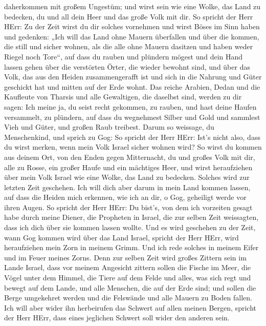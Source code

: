 daherkommen mit großem Ungestüm; und wirst sein wie eine Wolke, das Land
zu bedecken, du und all dein Heer und das große Volk mit dir.
 So spricht der Herr HErr: Zu der Zeit wirst du dir solches
vornehmen und wirst Böses im Sinn haben  und gedenken: „Ich
will das Land ohne Mauern überfallen und über die kommen, die still und
sicher wohnen, als die alle ohne Mauern dasitzen und haben weder Riegel
noch Tore``,  auf dass du rauben und plündern mögest und
dein Hand lassen gehen über die verstörten Örter, die wieder bewohnt
sind, und über das Volk, das aus den Heiden zusammengerafft ist und sich
in die Nahrung und Güter geschickt hat und mitten auf der Erde wohnt.
 Das reiche Arabien, Dedan und die Kaufleute von Tharsis
und alle Gewaltigen, die daselbst sind, werden zu dir sagen: Ich meine
ja, du seist recht gekommen, zu rauben, und hast deine Haufen
versammelt, zu plündern, auf dass du wegnehmest Silber und Gold und
sammlest Vieh und Güter, und großen Raub treibest.  Darum
so weissage, du Menschenkind, und sprich zu Gog: So spricht der Herr
HErr: Ist's nicht also, dass du wirst merken, wenn mein Volk Israel
sicher wohnen wird?  So wirst du kommen aus deinem Ort, von
den Enden gegen Mitternacht, du und großes Volk mit dir, alle zu Rosse,
ein großer Haufe und ein mächtiges Heer,  und wirst
heraufziehen über mein Volk Israel wie eine Wolke, das Land zu bedecken.
Solches wird zur letzten Zeit geschehen. Ich will dich aber darum in
mein Land kommen lassen, auf dass die Heiden mich erkennen, wie ich an
dir, o Gog, geheiligt werde vor ihren Augen.  So spricht
der Herr HErr: Du bist's, von dem ich vorzeiten gesagt habe durch meine
Diener, die Propheten in Israel, die zur selben Zeit weissagten, dass
ich dich über sie kommen lassen wollte.  Und es wird
geschehen zu der Zeit, wann Gog kommen wird über das Land Israel,
spricht der Herr HErr, wird heraufziehen mein Zorn in meinem Grimm.
 Und ich rede solches in meinem Eifer und im Feuer meines
Zorns. Denn zur selben Zeit wird großes Zittern sein im Lande Israel,
 dass vor meinem Angesicht zittern sollen die Fische im
Meer, die Vögel unter dem Himmel, die Tiere auf dem Felde und alles, was
sich regt und bewegt auf dem Lande, und alle Menschen, die auf der Erde
sind; und sollen die Berge umgekehret werden und die Felswände und alle
Mauern zu Boden fallen.  Ich will aber wider ihn
herbeirufen das Schwert auf allen meinen Bergen, spricht der Herr HErr,
dass eines jeglichen Schwert soll wider den anderen sein. 
